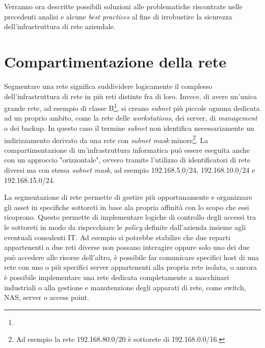 \documentclass[target=bach,aauheader=]{thud}
\begin{document}
Verranno ora descritte possibili soluzioni alle problematiche riscontrate nelle precedenti analisi e alcune \textit{best practices} al fine di irrobustire la sicurezza dell'infrastruttura di rete aziendale.

\section{Compartimentazione della rete}

Segmentare una rete significa suddividere logicamente il complesso dell'infrastruttura di rete in più reti distinte fra di loro. Invece, di avere un'unica grande rete, ad esempio di classe B\footnote{}, si creano \textit{subnet} più piccole ognuna dedicata ad un proprio ambito, come la rete delle \textit{workstations}, dei server, di \textit{management} o dei backup. In questo caso il termine \textit{subnet} non identifica necessariamente un indirizzamento derivato da una rete con \textit{subnet mask} minore\footnote{Ad esempio la rete 192.168.80.0/20 è sottorete di 192.168.0.0/16.}. La compartimentazione di un'infrastruttura informatica può essere eseguita anche con un approccio "orizzontale", ovvero tramite l'utilizzo di identificatori di rete diversi ma con stessa \textit{subnet mask}, ad esempio 192.168.5.0/24, 192.168.10.0/24 e 192.168.15.0/24.

La segmentazione di rete permette di gestire più opportunamente e organizzare gli asset in specifiche sottoreti in base ala propria affinità con lo scopo che essi ricoprono. Questo permette di implementare logiche di controllo degli accessi tra le sottoreti in modo da rispecchiare le \textit{policy} definite dall'azienda insieme agli eventuali consulenti IT. Ad esempio si potrebbe stabilire che due reparti appartenenti a due reti diverse non possano interagire oppure solo uno dei due può accedere alle risorse dell'altro, è possibile far comunicare specifici host di una rete con uno o più specifici server appartenenti alla propria rete isolata, o ancora è possibile implementare una rete dedicata completamente a macchinari industriali o alla gestione e manutenzione degli apparati di rete, come switch, NAS, server o access point.
\end{document}
